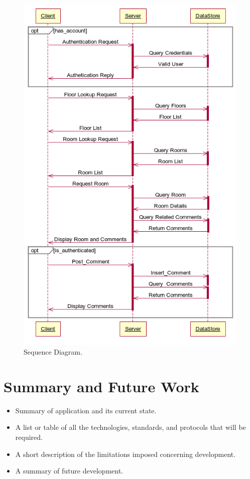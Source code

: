 \documentclass{sig-alt-release2}
\begin{document}
\begin{figure}
                \includegraphics[scale=0.35]{img/dia.png}
                \caption{Sequence Diagram.}
                \label{img:diagram-sequence}
\end{figure}




\section{Summary and Future Work}
\begin{itemize}
\item	Summary of application and its current state.
\item	A list or table of all the technologies, standards, and protocols that will be required.
\item	A short description of the limitations imposed concerning development.
\item   A summary of future development.
\end{itemize}
\end{document}
